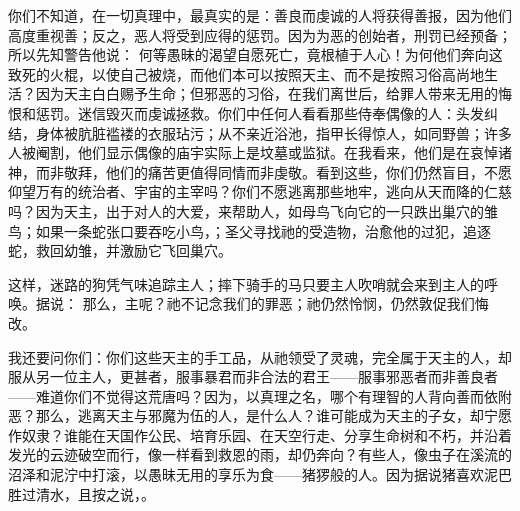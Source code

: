 你们不知道，在一切真理中，最真实的是：善良而虔诚的人将获得善报，因为他们高度重视善；反之，恶人将受到应得的惩罚。因为为恶的创始者，刑罚已经预备；所以先知警告他说： 何等愚昧的渴望自愿死亡，竟根植于人心！为何他们奔向这致死的火棍，以使自己被烧，而他们本可以按照天主、而不是按照习俗高尚地生活？因为天主白白赐予生命；但邪恶的习俗，在我们离世后，给罪人带来无用的悔恨和惩罚。迷信毁灭而虔诚拯救。你们中任何人看看那些侍奉偶像的人：头发纠结，身体被肮脏褴褛的衣服玷污；从不亲近浴池，指甲长得惊人，如同野兽；许多人被阉割，他们显示偶像的庙宇实际上是坟墓或监狱。在我看来，他们是在哀悼诸神，而非敬拜，他们的痛苦更值得同情而非虔敬。看到这些，你们仍然盲目，不愿仰望万有的统治者、宇宙的主宰吗？你们不愿逃离那些地牢，逃向从天而降的仁慈吗？因为天主，出于对人的大爱，来帮助人，如母鸟飞向它的一只跌出巢穴的雏鸟；如果一条蛇张口要吞吃小鸟，；圣父寻找祂的受造物，治愈他的过犯，追逐蛇，救回幼雏，并激励它飞回巢穴。\par

这样，迷路的狗凭气味追踪主人；摔下骑手的马只要主人吹哨就会来到主人的呼唤。据说： 那么，主呢？祂不记念我们的罪恶；祂仍然怜悯，仍然敦促我们悔改。\par

我还要问你们：你们这些天主的手工品，从祂领受了灵魂，完全属于天主的人，却服从另一位主人，更甚者，服事暴君而非合法的君王——服事邪恶者而非善良者——难道你们不觉得这荒唐吗？因为，以真理之名，哪个有理智的人背向善而依附恶？那么，逃离天主与邪魔为伍的人，是什么人？谁可能成为天主的子女，却宁愿作奴隶？谁能在天国作公民、培育乐园、在天空行走、分享生命树和不朽，并沿着发光的云迹破空而行，像一样看到救恩的雨，却仍奔向？有些人，像虫子在溪流的沼泽和泥泞中打滚，以愚昧无用的享乐为食——猪猡般的人。因为据说猪喜欢泥巴胜过清水，且按之说，。\par

